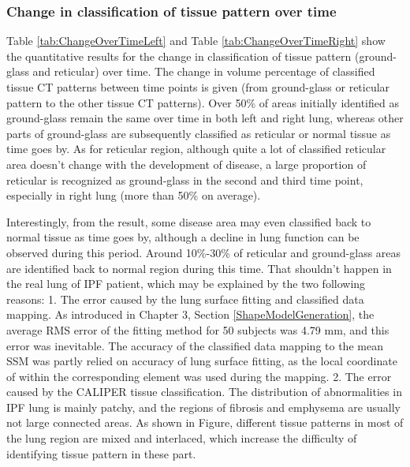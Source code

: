 \subsubsection{Change in classification of tissue pattern over time}
Table \ref{tab:ChangeOverTimeLeft} and Table \ref{tab:ChangeOverTimeRight} show the quantitative results for the change in classification of tissue pattern (ground-glass and reticular) over time. The change in volume percentage of classified tissue CT patterns between time points is given (from ground-glass or reticular pattern to the other tissue CT patterns). Over 50\% of areas initially identified as ground-glass remain the same over time in both left and right lung, whereas other parts of ground-glass are subsequently classified as reticular or normal tissue as time goes by. As for reticular region, although quite a lot of classified reticular area doesn't change with the development of disease, a large proportion of reticular is recognized as ground-glass in the second and third time point, especially in right lung (more than 50\% on average). 

Interestingly, from the result, some disease area may even classified back to normal tissue as time goes by, although a decline in lung function can be observed during this period. Around 10\%-30\% of reticular and ground-glass areas are identified back to normal region during this time. That shouldn't happen in the real lung of IPF patient, which may be explained by the two following reasons: 1. The error caused by the lung surface fitting and classified data mapping. As introduced in Chapter 3, Section \ref{ShapeModelGeneration}, the average RMS error of the fitting method for 50 subjects was 4.79 mm, and this error was inevitable. The accuracy of the classified data mapping to the mean SSM was partly relied on accuracy of lung surface fitting, as the local coordinate of within the corresponding element was used during the mapping. 2. The error caused by the CALIPER tissue classification. The distribution of abnormalities in IPF lung is mainly patchy, and the regions of fibrosis and emphysema are usually not large connected areas. As shown in Figure, different tissue patterns in most of the lung region are mixed and interlaced, which increase the difficulty of identifying tissue pattern in these part.

